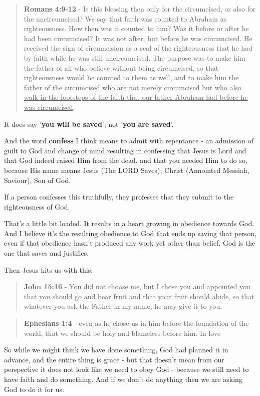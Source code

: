 \documentclass[11pt]{article}
\begin{document}
\begin{quote}
\textbf{Romans 4:9-12} - Is this blessing then only for the circumcised, or also for the uncircumcised? We say that faith was counted to Abraham as righteousness. How then was it counted to him? Was it before or after he had been circumcised? It was not after, but before he was circumcised. He received the sign of circumcision as a seal of the righteousness that he had by faith while he was still uncircumcised. The purpose was to make him the father of all who believe without being circumcised, so that righteousness would be counted to them as well, and to make him the father of the circumcised who are \uline{not merely circumcised but who also walk in the footsteps of the faith that our father Abraham had before he was circumcised}.
\end{quote}

It does say '\textbf{you will be saved}', not '\textbf{you are saved}'.

And the word \textbf{confess} I think means to admit with repentance - an admission of guilt to God and change of mind resulting in confessing that Jesus is Lord and that God indeed raised Him from the dead, and that you needed Him to do so, because His name means Jesus (The LORD Saves), Christ (Annointed Messiah, Saviour), Son of God.

If a person confesses this truthfully, they professes that they submit to the righteousness of God.

That's a little bit loaded. It results in a heart growing in obedience towards God.
And I believe it's the resulting obedience to God that ends up saving that person, even if that obedience hasn't produced any work yet other than belief. God is the one that saves and justifies.

Then Jesus hits us with this:

\begin{quote}
\textbf{John 15:16} - You did not choose me, but I chose you and appointed you that you should go and bear fruit and that your fruit should abide, so that whatever you ask the Father in my name, he may give it to you.
\end{quote}

\begin{quote}
\textbf{Ephesians 1:4} - even as he chose us in him before the foundation of the world, that we should be holy and blameless before him. In love
\end{quote}

So while we might think we have done something, God had planned it in advance, and the entire thing is grace - but that doesn't mean from our perspective it does not look like we need to obey God - because we still need to have faith and do something. And if we don't do anything then we are asking God to do it for us.
\end{document}
